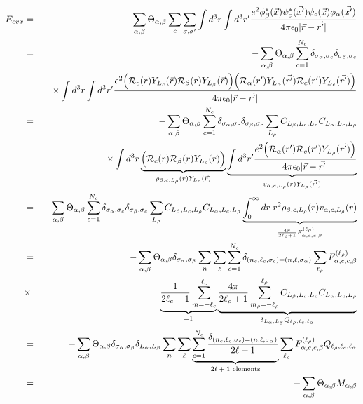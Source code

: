 \documentclass[11pt,a4paper]{report}
\begin{document}
\begin{eqnarray}
E_{cvx}
&=&-
\sum_{\alpha,\beta}\Theta_{\alpha,\beta}
\sum_c 
\sum_{\sigma,\sigma'}\int d^3r\int d^3r'
\frac{e^2
\phi^*_\beta(\vec{x})\psi^*_c(\vec{x'})
\psi_c(\vec{x})\phi_\alpha(\vec{x'})}{4\pi\epsilon_0|\vec{r}-\vec{r'}|}
\nonumber\\
%
&=&-
\sum_{\alpha,\beta}\Theta_{\alpha,\beta}
\sum_{c=1}^{N_c}\delta_{\sigma_\alpha,\sigma_c}\delta_{\sigma_\beta,\sigma_c}
\nonumber\\
&&\times\int d^3r\int d^3r'
\frac{e^2
\Bigl(
\mathcal{R}_{c}(r)Y_{L_c}(\vec{r})
\mathcal{R}_{\beta}(r)Y_{L_\beta}(\vec{r})
\Bigr)
\Bigl(
\mathcal{R}_{\alpha}(r')Y_{L_\alpha}(\vec{r'})
\mathcal{R}_{c}(r')Y_{L_c}(\vec{r'})
\Bigr)}
{4\pi\epsilon_0|\vec{r}-\vec{r'}|}
\nonumber\\
%
&=&-
\sum_{\alpha,\beta}\Theta_{\alpha,\beta}
\sum_{c=1}^{N_c}
\delta_{\sigma_\alpha,\sigma_c}\delta_{\sigma_\beta,\sigma_c}
\sum_{L_\rho}C_{L_\beta,L_c,L_\rho}C_{L_\alpha,L_c,L_\rho}
\nonumber\\
&&\times\int d^3r
\underbrace{
\Bigl(
\mathcal{R}_{c}(r)\mathcal{R}_{\beta}(r)Y_{L_\rho}(\vec{r})
\Bigr)
}_{\rho_{\beta,c,L_\rho}(r)Y_{L_\rho}(\vec{r})}
\underbrace{
\int d^3r'
\frac{e^2
\Bigl(
\mathcal{R}_{\alpha}(r')\mathcal{R}_{c}(r')Y_{L_\rho}(\vec{r'})
\Bigr)}
{4\pi\epsilon_0|\vec{r}-\vec{r'}|}
}_{v_{\alpha,c,L_\rho}(r)Y_{L_\rho}(\vec{r'})}
\nonumber\\
%
&=&-
\sum_{\alpha,\beta}\Theta_{\alpha,\beta}
\sum_{c=1}^{N_c}
\delta_{\sigma_\alpha,\sigma_c}\delta_{\sigma_\beta,\sigma_c}
\sum_{L_\rho}C_{L_\beta,L_c,L_\rho}C_{L_\alpha,L_c,L_\rho}
\underbrace{
\int_0^\infty dr\;r^2
\rho_{\beta,c,L_\rho}(r)v_{\alpha,c,L_\rho}(r)
}_{\frac{4\pi}{2\ell_\rho+1}F^{(\ell_\rho)}_{\alpha,c,c,\beta}}
\nonumber\\
%
&=&-
\sum_{\alpha,\beta}\Theta_{\alpha,\beta}\delta_{\sigma_\alpha,\sigma_\beta}
\sum_{n} \sum_\ell
\sum_{c=1}^{N_c}\delta_{(n_c,\ell_c,\sigma_c)=(n,\ell,\sigma_\alpha)}
\sum_{\ell_\rho}
F^{(\ell_\rho)}_{\alpha,c,c,\beta}
\nonumber\\
&\times&\underbrace{\frac{1}{2\ell_c+1}\sum_{m=-\ell_c}^{\ell_c}}_{=1}
\underbrace{
\frac{4\pi}{2\ell_\rho+1}
\sum_{m_\rho=-\ell_\rho}^{\ell_\rho}
C_{L_\beta,L_c,L_\rho}C_{L_\alpha,L_c,L_\rho}
}_{\delta_{L_\alpha,L_\beta}Q_{\ell_\rho,\ell_c,\ell_\alpha}}
\nonumber\\
%
&=&-
\sum_{\alpha,\beta}\Theta_{\alpha,\beta}\delta_{\sigma_\alpha,\sigma_\beta}
\delta_{L_\alpha,L_\beta}
\sum_{n} \sum_\ell
\underbrace{
\sum_{c=1}^{N_c}\frac{\delta_{(n_c,\ell_c,\sigma_c)=(n,\ell,\sigma_\alpha)}}{2\ell+1}
}_{\text{$2\ell+1$ elements}}
\sum_{\ell_\rho}
F^{(\ell_\rho)}_{\alpha,c,c,\beta}
Q_{\ell_\rho,\ell_c,\ell_\alpha}
\nonumber\\
%
&=&-
\sum_{\alpha,\beta}\Theta_{\alpha,\beta}M_{\alpha,\beta}
\end{eqnarray}
\end{document}
